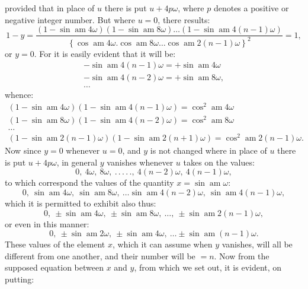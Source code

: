 \documentclass{article}
\begin{document}
provided that in place of $u$ there is put $u+4p\omega$, where $p$ denotes a positive or negative integer number. But where $u=0$, there results:
\[
1-y=\frac{\left(1-\sin\operatorname{am}4\omega\right)\left(1-\sin\operatorname{am}8\omega\right)\ldots\left(1-\sin\operatorname{am}4(n-1)\omega\right)}{\left\{\cos\operatorname{am}4\omega.\cos\operatorname{am}8\omega\ldots\cos\operatorname{am}2(n-1)\omega\right\}^{2}}=1,
\]
or $y=0$. For it is easily evident that it will be:
\[
\begin{gathered}
-\sin\operatorname{am}4(n-1)\omega=+\sin\operatorname{am}4\omega\\
-\sin\operatorname{am}4(n-2)\omega=+\sin\operatorname{am}8\omega,\\
\ldots
\end{gathered}
\]
whence:
\[
\begin{gathered}
\left(1-\sin\operatorname{am}4\omega\right)\left(1-\sin\operatorname{am}4(n-1)\omega\right)=\cos^{2}\operatorname{am}4\omega\\
\left(1-\sin\operatorname{am}8\omega\right)\left(1-\sin\operatorname{am}4(n-2)\omega\right)=\cos^{2}\operatorname{am}8\omega\\
\ldots\\
\left(1-\sin\operatorname{am}2(n-1)\omega\right)\left(1-\sin\operatorname{am}2(n+1)\omega\right)=\cos^{2}\operatorname{am}2(n-1)\omega.
\end{gathered}
\]
Now since $y=0$ whenever $u=0$, and $y$ is not changed where in place of $u$ there is put $u+4p\omega$, in general $y$ vanishes whenever $u$ takes on the values:
\[
0,\ 4\omega,\ 8\omega,\ .\,.\,.\,.\,.,\ 4(n-2)\omega,\ 4(n-1)\omega,
\]
to which correspond the values of the quantity $x=\sin\operatorname{am}\omega$:
\[
0,\ \sin\operatorname{am}4\omega,\ \sin\operatorname{am}8\omega,\ \ldots\sin\operatorname{am}4(n-2)\omega,\ \sin\operatorname{am}4(n-1)\omega,
\]
which it is permitted to exhibit also thus:
\[
0,\ \pm\sin\operatorname{am}4\omega,\ \pm\sin\operatorname{am}8\omega,\ \ldots,\ \pm\sin\operatorname{am}2(n-1)\omega,
\]
or even in this manner:
\[
0,\ \pm\sin\operatorname{am}2\omega,\ \pm\sin\operatorname{am}4\omega,\ \ldots\pm\sin\operatorname{am}(n-1)\omega.
\]
These values of the element $x$, which it can assume when $y$ vanishes, will all be different from one another, and their number will be $=n$. Now from the supposed equation between $x$ and $y$, from which we set out, it is evident, on putting:
\end{document}
